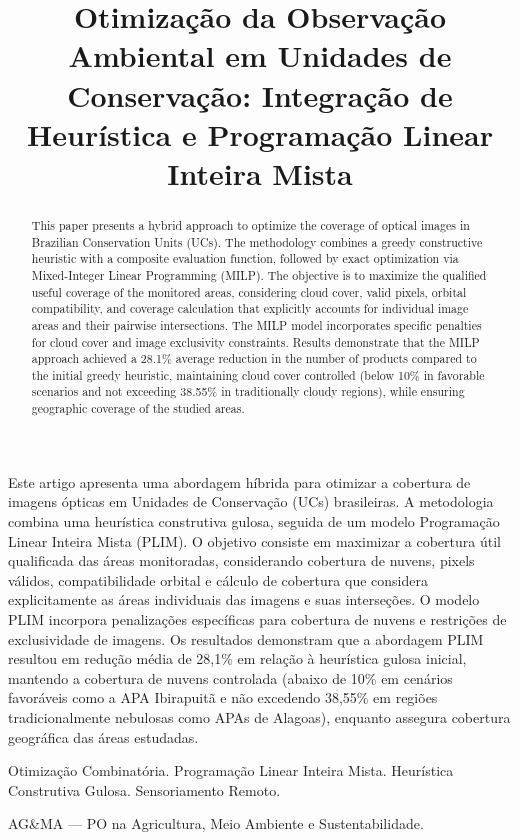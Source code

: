 \documentclass[a4paper,11pt]{article}
\begin{document}
\title{Otimização da Observação Ambiental em Unidades de Conservação: Integração de Heurística e Programação Linear Inteira Mista}

\maketitle
\thispagestyle{fancy}

\vspace{8mm}
\begin{resumo}
    Este artigo apresenta uma abordagem híbrida para otimizar a cobertura de imagens ópticas em Unidades de Conservação (UCs) brasileiras. A metodologia combina uma heurística construtiva gulosa, seguida de um modelo Programação Linear Inteira Mista (PLIM). O objetivo consiste em maximizar a cobertura útil qualificada das áreas monitoradas, considerando cobertura de nuvens, pixels válidos, compatibilidade orbital e cálculo de cobertura que considera explicitamente as áreas individuais das imagens e suas interseções. O modelo PLIM incorpora penalizações específicas para cobertura de nuvens e restrições de exclusividade de imagens. Os resultados demonstram que a abordagem PLIM resultou em redução média de 28,1\% em relação à heurística gulosa inicial, mantendo a cobertura de nuvens controlada (abaixo de 10\% em cenários favoráveis como a APA Ibirapuitã e não excedendo 38,55\% em regiões tradicionalmente nebulosas como APAs de Alagoas), enquanto assegura cobertura geográfica das áreas estudadas.
    \end{resumo}

\bigskip
\begin{palchaves}
Otimização Combinatória. Programação Linear Inteira Mista. Heurística Construtiva Gulosa. Sensoriamento Remoto.

\bigskip
AG\&MA --- PO na Agricultura, Meio Ambiente e Sustentabilidade.
\end{palchaves}

\begin{abstract}
    This paper presents a hybrid approach to optimize the coverage of optical images in Brazilian Conservation Units (UCs). The methodology combines a greedy constructive heuristic with a composite evaluation function, followed by exact optimization via Mixed-Integer Linear Programming (MILP). The objective is to maximize the qualified useful coverage of the monitored areas, considering cloud cover, valid pixels, orbital compatibility, and coverage calculation that explicitly accounts for individual image areas and their pairwise intersections. The MILP model incorporates specific penalties for cloud cover and image exclusivity constraints. Results demonstrate that the MILP approach achieved a 28.1\% average reduction in the number of products compared to the initial greedy heuristic, maintaining cloud cover controlled (below 10\% in favorable scenarios and not exceeding 38.55\% in traditionally cloudy regions), while ensuring geographic coverage of the studied areas.
    \end{abstract}
\end{document}
